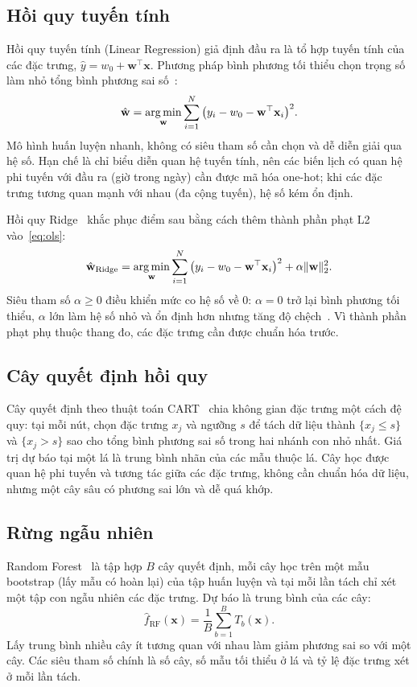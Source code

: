 \subsection{Hồi quy tuyến tính}
Hồi quy tuyến tính (Linear Regression) giả định đầu ra là tổ hợp tuyến tính của các đặc trưng, $\hat{y} = w_0 + \mathbf{w}^{\top}\mathbf{x}$. Phương pháp bình phương tối thiểu chọn trọng số làm nhỏ tổng bình phương sai số~\cite{hastie2009elements}:
\begin{equation}
    \hat{\mathbf{w}} = \operatorname*{arg\,min}_{\mathbf{w}} \sum_{i=1}^{N} \big(y_i - w_0 - \mathbf{w}^{\top}\mathbf{x}_i\big)^2 .
    \label{eq:ols}
\end{equation}
Mô hình huấn luyện nhanh, không có siêu tham số cần chọn và dễ diễn giải qua hệ số. Hạn chế là chỉ biểu diễn quan hệ tuyến tính, nên các biến lịch có quan hệ phi tuyến với đầu ra (giờ trong ngày) cần được mã hóa one-hot; khi các đặc trưng tương quan mạnh với nhau (đa cộng tuyến), hệ số kém ổn định.

Hồi quy Ridge~\cite{hoerl1970ridge} khắc phục điểm sau bằng cách thêm thành phần phạt L2 vào~\eqref{eq:ols}:
\begin{equation}
    \hat{\mathbf{w}}_{\text{Ridge}} = \operatorname*{arg\,min}_{\mathbf{w}} \sum_{i=1}^{N} \big(y_i - w_0 - \mathbf{w}^{\top}\mathbf{x}_i\big)^2 + \alpha \lVert\mathbf{w}\rVert_2^2 .
    \label{eq:ridge}
\end{equation}
Siêu tham số $\alpha \ge 0$ điều khiển mức co hệ số về 0: $\alpha = 0$ trở lại bình phương tối thiểu, $\alpha$ lớn làm hệ số nhỏ và ổn định hơn nhưng tăng độ chệch~\cite[mục 3.4]{hastie2009elements}. Vì thành phần phạt phụ thuộc thang đo, các đặc trưng cần được chuẩn hóa trước.

\subsection{Cây quyết định hồi quy}
Cây quyết định theo thuật toán CART~\cite{breiman1984classification} chia không gian đặc trưng một cách đệ quy: tại mỗi nút, chọn đặc trưng $x_j$ và ngưỡng $s$ để tách dữ liệu thành $\{x_j \le s\}$ và $\{x_j > s\}$ sao cho tổng bình phương sai số trong hai nhánh con nhỏ nhất. Giá trị dự báo tại một lá là trung bình nhãn của các mẫu thuộc lá. Cây học được quan hệ phi tuyến và tương tác giữa các đặc trưng, không cần chuẩn hóa dữ liệu, nhưng một cây sâu có phương sai lớn và dễ quá khớp.

\subsection{Rừng ngẫu nhiên}
Random Forest~\cite{breiman2001random} là tập hợp $B$ cây quyết định, mỗi cây học trên một mẫu bootstrap (lấy mẫu có hoàn lại) của tập huấn luyện và tại mỗi lần tách chỉ xét một tập con ngẫu nhiên các đặc trưng. Dự báo là trung bình của các cây:
\begin{equation}
    \hat{f}_{\text{RF}}(\mathbf{x}) = \frac{1}{B}\sum_{b=1}^{B} T_b(\mathbf{x}).
    \label{eq:rf}
\end{equation}
Lấy trung bình nhiều cây ít tương quan với nhau làm giảm phương sai so với một cây. Các siêu tham số chính là số cây, số mẫu tối thiểu ở lá và tỷ lệ đặc trưng xét ở mỗi lần tách.

